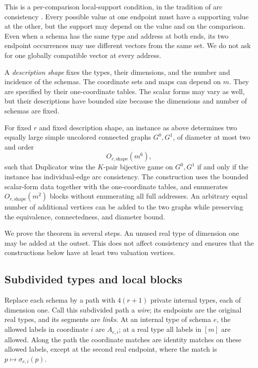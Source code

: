 This is a per-comparison local-support condition, in the tradition of arc
consistency \cite[Section~4]{Mackworth1977}. Every possible value at one
endpoint must have a supporting value at the other, but the support may
depend on the value and on the comparison. Even when a schema has the
same type and address at both ends, its two endpoint occurrences may
use different vectors from the same set. We do not ask for one globally
compatible vector at every address.

A \emph{description shape} fixes the types, their dimensions, and the
number and incidence of the schemas.  The coordinate sets and maps can
depend on $m$.  They are specified by their one-coordinate tables.
The scalar forms may vary as well, but their descriptions have bounded
size because the dimensions and number of schemas are fixed.

\begin{theorem}\label{comp:reduction}
For fixed $r$ and fixed description shape, an instance as above determines
two equally large simple uncolored connected graphs $G^0,G^1$, of
diameter at most two and order
\[
                         O_{r,\mathrm{shape}}(m^6),
\]
such that Duplicator wins the $K$-pair bijective game on $G^0,G^1$ if and
only if the instance has individual-edge arc consistency.
The construction uses the bounded scalar-form data together with the
one-coordinate tables, and enumerates $O_{r,\mathrm{shape}}(m^2)$ blocks
without enumerating all full addresses.
An arbitrary equal number of additional vertices can be added to the two
graphs while preserving the equivalence, connectedness, and diameter
bound.
\end{theorem}

We prove the theorem in several steps.  An unused real type of dimension
one may be added at the outset.  This does not affect consistency and
ensures that the constructions below have at least two valuation vertices.

\subsection{Subdivided types and local blocks}

Replace each schema by a path with $4(r+1)$ private internal types, each
of dimension one.  Call this subdivided path a \emph{wire}; its endpoints
are the original real types, and its segments are \emph{links}.
At an internal type of schema $e$,
the allowed labels in coordinate $i$ are $A_{e,i}$; at a real type all
labels in $[m]$ are allowed.  Along the path the coordinate matches are
identity matches on these allowed labels, except at the second real
endpoint, where the match is $p\mapsto\sigma_{e,i}(p)$.

